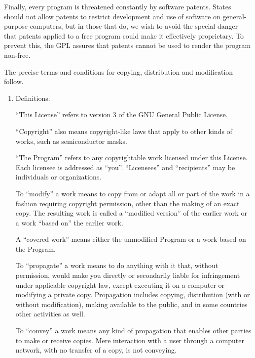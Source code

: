 \documentclass[a4paper,10pt,DIV=15,openany]{scrbook}
\begin{document}
{\begin{shaded}
Finally, every program is threatened constantly by software patents.
States should not allow patents to restrict development and use of
software on general-purpose computers, but in those that do, we wish to
avoid the special danger that patents applied to a free program could
make it effectively proprietary.  To prevent this, the GPL assures that
patents cannot be used to render the program non-free.

The precise terms and conditions for copying, distribution and
modification follow.



\begin{enumerate}

\addtocounter{enumi}{-1}

\item Definitions.

``This License'' refers to version 3 of the GNU General Public License.

``Copyright'' also means copyright-like laws that apply to other kinds of
works, such as semiconductor masks.

``The Program'' refers to any copyrightable work licensed under this
License.  Each licensee is addressed as ``you''.  ``Licensees'' and
``recipients'' may be individuals or organizations.

To ``modify'' a work means to copy from or adapt all or part of the work
in a fashion requiring copyright permission, other than the making of an
exact copy.  The resulting work is called a ``modified version'' of the
earlier work or a work ``based on'' the earlier work.

A ``covered work'' means either the unmodified Program or a work based
on the Program.

To ``propagate'' a work means to do anything with it that, without
permission, would make you directly or secondarily liable for
infringement under applicable copyright law, except executing it on a
computer or modifying a private copy.  Propagation includes copying,
distribution (with or without modification), making available to the
public, and in some countries other activities as well.

To ``convey'' a work means any kind of propagation that enables other
parties to make or receive copies.  Mere interaction with a user through
a computer network, with no transfer of a copy, is not conveying.


\end{enumerate}
\end{shaded}}
\end{document}
